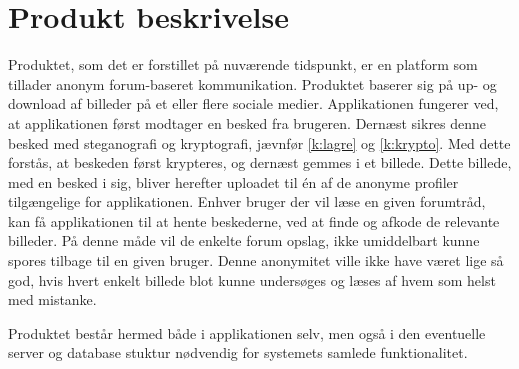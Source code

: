 \section{Produkt beskrivelse}
\label{produkt_beskrivelse}
Produktet, som det er forstillet på nuværende tidspunkt, er en platform som tillader anonym forum-baseret kommunikation. Produktet baserer sig på up- og download af billeder på et eller flere sociale medier. Applikationen fungerer ved, at applikationen først modtager en besked fra brugeren. Dernæst sikres denne besked med steganografi og kryptografi, jævnfør \ref{k:lagre} og \ref{k:krypto}. Med dette forstås, at beskeden først krypteres, og dernæst gemmes i et billede. Dette billede, med en besked i sig, bliver herefter uploadet til én af de anonyme profiler tilgængelige for applikationen. Enhver bruger der vil læse en given forumtråd, kan få applikationen til at hente beskederne, ved at finde og afkode de relevante billeder. På denne måde vil de enkelte forum opslag, ikke umiddelbart kunne spores tilbage til en given bruger. Denne anonymitet ville ikke have været lige så god, hvis hvert enkelt billede blot kunne undersøges og læses af hvem som helst med mistanke.

Produktet består hermed både i applikationen selv, men også i den eventuelle server og database stuktur nødvendig for systemets samlede funktionalitet.
